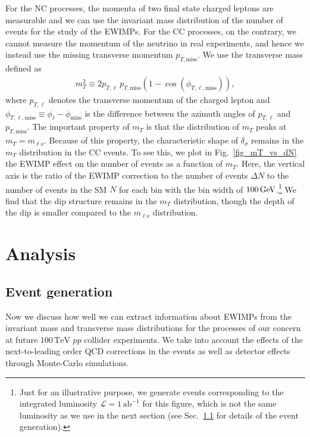 \documentclass[12pt, a4paper]{article}
\begin{document}
For the NC processes, the momenta of two final state charged leptons are
measurable and we can use the invariant mass distribution of the number
of events for the study of the EWIMPs.  For the CC processes, on the
contrary, we cannot measure the momentum of the neutrino in real
experiments, and hence we instead use the missing transverse momentum
$p_{T,\mathrm{miss}}$.  We use the transverse mass defined as
\begin{align}
 m_T^2 \equiv 2 p_{T, \ell}\,p_{T,\mathrm{miss}} \left( 1-\cos
 (\phi_{T,\ell,\mathrm{miss}}) \right),
\end{align}
where $p_{T, \ell}$ denotes the transverse momentum of the charged
lepton and $\phi_{T,\ell,\mathrm{miss}} \equiv \phi_{\ell} -
\phi_\mathrm{miss}$ is the difference between the azimuth angles of
$p_{T,\ell}$ and $p_{T,\mathrm{miss}}$.  The important property of $m_T$
is that the distribution of $m_T$ peaks at $m_T = m_{\ell\nu}$.  Because
of this property, the characteristic shape of $\delta_\sigma$ remains in
the $m_T$ distribution in the CC events.  To see this, we plot in
Fig.~\ref{fig_mT_vs_dN} the EWIMP effect on the number of events as a
function of $m_T$.  Here, the vertical axis is the ratio of the EWIMP
correction to the number of events $\Delta N$ to the number of events in
the SM $N$ for each bin with the bin width of $100\, {\rm GeV}$.\footnote{
  Just for an illustrative purpose, we generate events corresponding
  to the integrated luminosity $\mathcal{L} = 1\,\mathrm{ab}^{-1}$ for
  this figure, which is not the same luminosity as we use in the next
  section (see Sec.~\ref{sec_event} for details of the event
  generation).
} We find that the dip structure remains in the $m_T$ distribution,
though the depth of the dip is smaller compared to the $m_{\ell\nu}$
distribution.

\section{Analysis}
\label{sec:analysis}

\subsection{Event generation}
\label{sec_event}

Now we discuss how well we can extract information about EWIMPs from the
invariant mass and transverse mass distributions for the processes of
our concern at future $100\,\mathrm{TeV}$ $pp$ collider experiments.  We
take into account the effects of the next-to-leading order QCD
corrections in the events as well as detector effects through
Monte-Carlo simulations.
\end{document}
